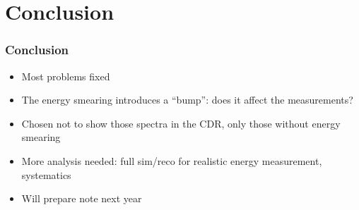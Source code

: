 \documentclass{beamer}
\begin{document}
\section{Conclusion}
\begin{frame}
\frametitle{Conclusion}
\begin{itemize}
  \item Most problems fixed
  \item The energy smearing introduces a ``bump'': does it affect the
  measurements?
  \item Chosen not to show those spectra in the CDR, only those without energy
  smearing
  \item More analysis needed: full sim/reco for realistic energy measurement,
  systematics
  \item Will prepare note next year
\end{itemize}
\end{frame}
\end{document}
